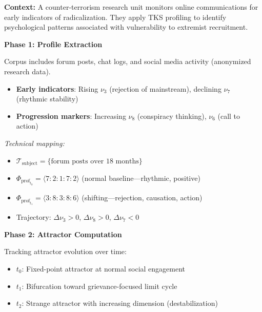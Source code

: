 \documentclass[11pt,twoside]{book}
\newcommand{\noe}[1]{\nu_{#1}}
\newcommand{\ProfileFrac}{\Phi_{\mathrm{prof}}}
\newcommand{\TextCorpus}{\mathcal{T}}
\begin{document}
\begin{tcolorbox}[colback=yellow!5!white,colframe=yellow!65!black,title=\textbf{Scenario 4: Security Application --- Radicalization Detection},breakable]

\textbf{Context:}
A counter-terrorism research unit monitors online communications for early indicators of
radicalization. They apply TKS profiling to identify psychological patterns associated
with vulnerability to extremist recruitment.

\textbf{Phase 1: Profile Extraction}

Corpus includes forum posts, chat logs, and social media activity (anonymized research data).
\begin{itemize}
    \item \textbf{Early indicators}: Rising $\noe{3}$ (rejection of mainstream), declining $\noe{7}$ (rhythmic stability)
    \item \textbf{Progression markers}: Increasing $\noe{8}$ (conspiracy thinking), $\noe{6}$ (call to action)
\end{itemize}

\textit{Technical mapping:}
\begin{itemize}
    \item $\TextCorpus_{\mathrm{subject}} = \{\text{forum posts over 18 months}\}$
    \item $\ProfileFrac_{t_0} = \langle 7:2:1:7:2 \rangle$ (normal baseline---rhythmic, positive)
    \item $\ProfileFrac_{t_1} = \langle 3:8:3:8:6 \rangle$ (shifting---rejection, causation, action)
    \item Trajectory: $\Delta\noe{3} > 0$, $\Delta\noe{8} > 0$, $\Delta\noe{7} < 0$
\end{itemize}

\textbf{Phase 2: Attractor Computation}

Tracking attractor evolution over time:
\begin{itemize}
    \item $t_0$: Fixed-point attractor at normal social engagement
    \item $t_1$: Bifurcation toward grievance-focused limit cycle
    \item $t_2$: Strange attractor with increasing dimension (destabilization)
\end{itemize}


\end{tcolorbox}
\end{document}
